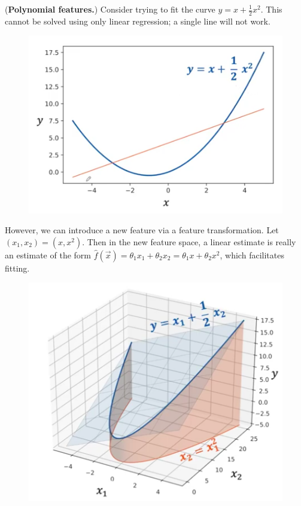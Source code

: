\begin{frameex}
(\textbf{Polynomial features.}) Consider trying to fit the curve $y = x + \frac{1}{2}x^2$. This cannot be solved using only linear regression; a single line will not work.
\begin{figure}[H]
\centering
\includegraphics[scale=0.3]{quadvslinear.png}
\end{figure}
However, we can introduce a new feature via a feature transformation. Let $(x_1, x_2) = (x,x^2)$. Then in the new feature space, a linear estimate is really an estimate of the form $\hat{f}(\vec{x}) = \theta_1 x_1 + \theta_2 x_2 = \theta_1 x + \theta_2 x^2$, which facilitates fitting.
\begin{figure}[H]
\centering
\includegraphics[scale=0.3]{featuretrans.png}
\end{figure}
\end{frameex}



